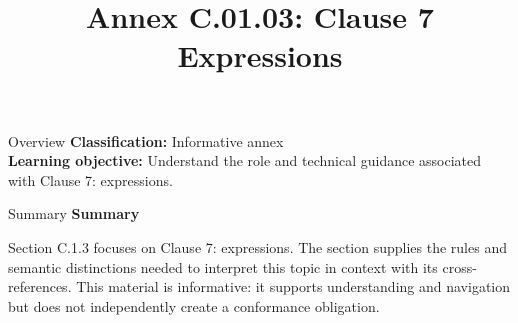 \documentclass[10pt,letterpaper]{article}
\title{Annex C.01.03: Clause 7 Expressions}
\author{}
\date{}
\begin{document}
\maketitle
\begin{CornellOverviewBox}{Overview}
\textbf{Classification:} Informative annex\\[2pt]
\textbf{Learning objective:} Understand the role and technical guidance associated with Clause 7: expressions.
\end{CornellOverviewBox}\begin{CornellSummaryBox}{Summary}
{\sffamily\bfseries\color{Accent} Summary}\par\vspace{3pt}Section C.1.3 focuses on Clause 7: expressions. The section supplies the rules and semantic distinctions needed to interpret this topic in context with its cross-references. This material is informative: it supports understanding and navigation but does not independently create a conformance obligation.
\end{CornellSummaryBox}
\end{document}
